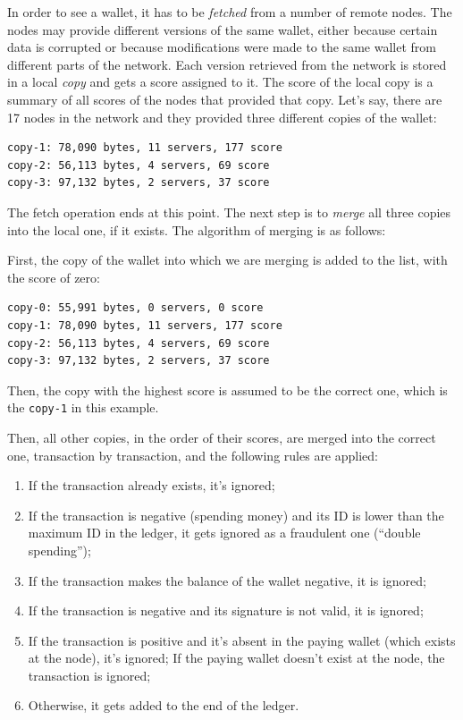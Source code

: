 \documentclass[11pt,oneside]{article}
\newcommand\dd[1]{\colorbox{gray!30}{\texttt{#1}}}
\begin{document}
In order to see a wallet, it has to be \emph{fetched} from a number of remote
nodes. The nodes may provide different versions of the same wallet, either
because certain data is corrupted or because modifications were made to the same
wallet from different parts of the network. Each version retrieved from the
network is stored in a local \emph{copy} and gets a score assigned to it.
The score of the local copy is a summary of all scores of the nodes that
provided that copy. Let's say, there are 17 nodes in the network and they
provided three different copies of the wallet:

\begin{verbatim}
copy-1: 78,090 bytes, 11 servers, 177 score
copy-2: 56,113 bytes, 4 servers, 69 score
copy-3: 97,132 bytes, 2 servers, 37 score
\end{verbatim}

The fetch operation ends at this point. The next step is to \emph{merge}
all three copies into the local one, if it exists. The algorithm of merging
is as follows:

First, the copy of the wallet into which we are merging is added to the list,
with the score of zero:

\begin{verbatim}
copy-0: 55,991 bytes, 0 servers, 0 score
copy-1: 78,090 bytes, 11 servers, 177 score
copy-2: 56,113 bytes, 4 servers, 69 score
copy-3: 97,132 bytes, 2 servers, 37 score
\end{verbatim}

Then, the copy with the highest score is assumed to be the correct one,
which is the \dd{copy-1} in this example.

Then, all other copies, in the order of their scores, are merged into the
correct one, transaction by transaction, and the following rules are applied:

\begin{enumerate}
\item If the transaction already exists, it's ignored;
\item If the transaction is negative (spending money) and its ID is lower than
the maximum ID in the ledger, it gets ignored as a fraudulent one (``double spending'');
\item If the transaction makes the balance of the wallet negative, it is ignored;
\item If the transaction is negative and its signature is not valid, it is ignored;
\item If the transaction is positive and it's absent in the paying wallet
(which exists at the node), it's ignored; If the paying wallet doesn't exist at the node,
the transaction is ignored;
\item Otherwise, it gets added to the end of the ledger.
\end{enumerate}
\end{document}
